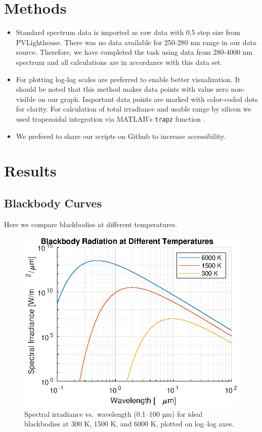 \documentclass[11pt,a4paper]{article}
\begin{document}
\section{Methods}
\begin{itemize}
  \item Standard spectrum data is imported as raw data with 0.5 step size from PVLighthouse. There was no data available for 250-280 nm range in our data source. Therefore, we have completed the task using data from 280-4000 nm spectrum and all calculations are in accordance with this data set. 
  \item For plotting log-log scales are preferred to enable better visualization. It should be noted that this method makes data points with value zero non-visible on our graph. Important data points are marked with color-coded dots for clarity. For calculation of total irradiance and usable range by silicon we used trapezoidal integration via MATLAB’s \texttt{trapz} function .
  \item We prefered to share our scripts on Github to increase accessibility.
\end{itemize}

\section{Results}

\subsection{Blackbody Curves}
Here we compare blackbodies at different temperatures.
\begin{figure}[!htbp]
  \centering
  \includegraphics[width=0.8\linewidth]{blackbody_spectra.eps}
  \caption{Spectral irradiance vs.\ wavelength (0.1–100 µm) for ideal blackbodies at 300 K, 1500 K, and 6000 K, plotted on log–log axes.}
  \label{fig:blackbody}
\end{figure}
\end{document}
